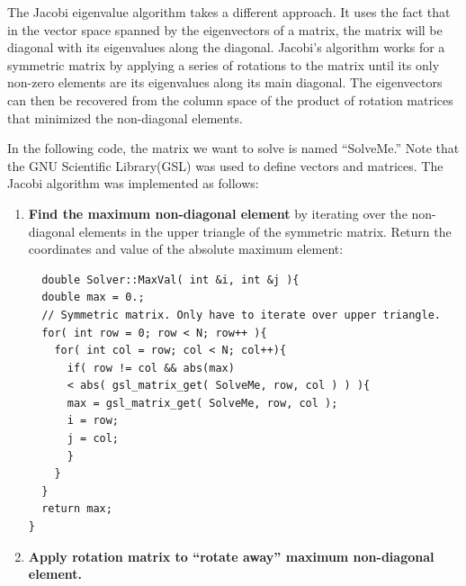 \documentclass[a4paper,12pt]{report}
\begin{document}
The Jacobi eigenvalue algorithm takes a different approach. It uses the fact that in the vector space spanned by the eigenvectors of a matrix, the matrix will be diagonal with its eigenvalues along the diagonal. Jacobi's algorithm works for a symmetric matrix by applying a series of rotations to the matrix until its only non-zero elements are its eigenvalues along its main diagonal. The eigenvectors can then be recovered from the column space of the product of rotation matrices that minimized the non-diagonal elements. 

In the following code, the matrix we want to solve is named ``SolveMe.'' Note that the GNU Scientific Library(GSL)\cite{Galassi:2015} was used to define vectors and matrices. The Jacobi algorithm was implemented as follows:
\singlespacing
\begin{enumerate}
 \item \textbf{Find the maximum non-diagonal element} by iterating over the non-diagonal elements in the upper triangle of the symmetric matrix. Return the coordinates and value of the absolute maximum element:
 \begin{verbatim}
  double Solver::MaxVal( int &i, int &j ){
  double max = 0.;
  // Symmetric matrix. Only have to iterate over upper triangle.
  for( int row = 0; row < N; row++ ){
    for( int col = row; col < N; col++){
      if( row != col && abs(max) 
	  < abs( gsl_matrix_get( SolveMe, row, col ) ) ){
	  max = gsl_matrix_get( SolveMe, row, col );
	  i = row;
	  j = col;
      }
    }
  } 
  return max;
}
 \end{verbatim}

 \item \textbf{Apply rotation matrix to ``rotate away'' maximum non-diagonal element.} 
 

\end{enumerate}
\end{document}
